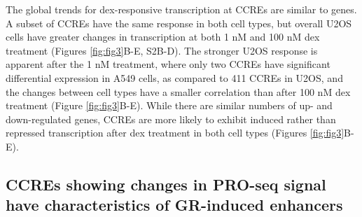 \documentclass{article}
\begin{document}
{The global trends for dex-responsive transcription at CCREs are similar to genes. A subset of CCREs have the same response in both cell types, but overall U2OS cells have greater changes in transcription at both 1 nM and 100 nM dex treatment (Figures \ref{fig:fig3}B-E, S2B-D). The stronger U2OS response is apparent after the 1 nM treatment, where only two CCREs have significant differential expression in A549 cells, as compared to 411 CCREs in U2OS, and the changes between cell types have a smaller correlation than after 100 nM dex treatment (Figure \ref{fig:fig3}B-E). While there are similar numbers of up- and down-regulated genes, CCREs are more likely to exhibit induced rather than repressed transcription after dex treatment in both cell types (Figures \ref{fig:fig3}B-E).


\subsection*{CCREs showing changes in PRO-seq signal have characteristics of GR-induced enhancers}

}
\end{document}

